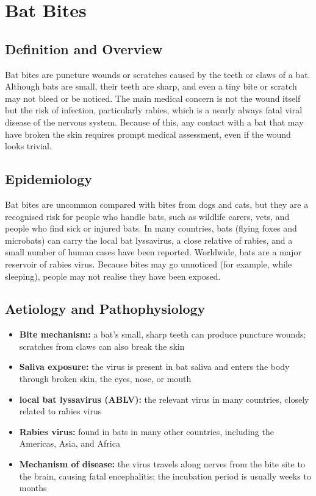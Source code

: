 \chapter{Bat Bites}

\section*{Definition and Overview}
Bat bites are puncture wounds or scratches caused by the teeth or claws of a bat. Although bats are small, their teeth are sharp, and even a tiny bite or scratch may not bleed or be noticed. The main medical concern is not the wound itself but the risk of infection, particularly rabies, which is a nearly always fatal viral disease of the nervous system. Because of this, any contact with a bat that may have broken the skin requires prompt medical assessment, even if the wound looks trivial.

\section*{Epidemiology}
Bat bites are uncommon compared with bites from dogs and cats, but they are a recognised risk for people who handle bats, such as wildlife carers, vets, and people who find sick or injured bats. In many countries, bats (flying foxes and microbats) can carry the local bat lyssavirus, a close relative of rabies, and a small number of human cases have been reported. Worldwide, bats are a major reservoir of rabies virus. Because bites may go unnoticed (for example, while sleeping), people may not realise they have been exposed.

\section*{Aetiology and Pathophysiology}
\begin{itemize}
    \item \textbf{Bite mechanism:} a bat's small, sharp teeth can produce puncture wounds; scratches from claws can also break the skin
    \item \textbf{Saliva exposure:} the virus is present in bat saliva and enters the body through broken skin, the eyes, nose, or mouth
    \item \textbf{local bat lyssavirus (ABLV):} the relevant virus in many countries, closely related to rabies virus
    \item \textbf{Rabies virus:} found in bats in many other countries, including the Americas, Asia, and Africa
    \item \textbf{Mechanism of disease:} the virus travels along nerves from the bite site to the brain, causing fatal encephalitis; the incubation period is usually weeks to months
\end{itemize}

